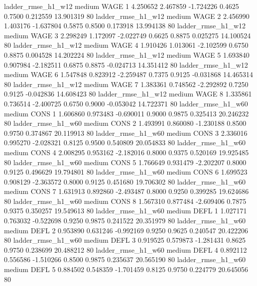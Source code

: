     ladder_rmse_h1_w12     medium     WAGE                 1  4.250652 2.467859 -1.724226 0.4625 0.7500  0.212559   13.901319 80
    ladder_rmse_h1_w12     medium     WAGE                 2  2.456990 1.403176 -1.637804 0.5875 0.8500  0.173918   13.994138 80
    ladder_rmse_h1_w12     medium     WAGE                 3  2.298249 1.172097 -2.022749 0.6625 0.8875  0.025275   14.100524 80
    ladder_rmse_h1_w12     medium     WAGE                 4  1.910426 1.013061 -2.102599 0.6750 0.8875  0.004528   14.202224 80
    ladder_rmse_h1_w12     medium     WAGE                 5  1.693840 0.907984 -2.182511 0.6875 0.8875 -0.024713   14.351412 80
    ladder_rmse_h1_w12     medium     WAGE                 6  1.547848 0.823912 -2.259487 0.7375 0.9125 -0.031868   14.465314 80
    ladder_rmse_h1_w12     medium     WAGE                 7  1.383361 0.748562 -2.292892 0.7250 0.9125 -0.042836   14.608423 80
    ladder_rmse_h1_w12     medium     WAGE                 8  1.335861 0.736514 -2.400725 0.6750 0.9000 -0.053042   14.722371 80
    ladder_rmse_h1_w60     medium     CONS                 1  1.606860 0.973483 -0.690011 0.9000 0.9875  0.325413   20.246232 80
    ladder_rmse_h1_w60     medium     CONS                 2  1.493991 0.860080 -1.230188 0.8500 0.9750  0.374867   20.119913 80
    ladder_rmse_h1_w60     medium     CONS                 3  2.336016 0.995270 -2.028321 0.8125 0.9500  0.540809   20.054833 80
    ladder_rmse_h1_w60     medium     CONS                 4  2.008295 0.953162 -2.182016 0.8000 0.9375  0.520169   19.925485 80
    ladder_rmse_h1_w60     medium     CONS                 5  1.766649 0.931479 -2.202207 0.8000 0.9125  0.496629   19.794801 80
    ladder_rmse_h1_w60     medium     CONS                 6  1.699523 0.908129 -2.363572 0.8000 0.9125  0.451680   19.706302 80
    ladder_rmse_h1_w60     medium     CONS                 7  1.631913 0.892860 -2.493487 0.8000 0.9250  0.399285   19.624686 80
    ladder_rmse_h1_w60     medium     CONS                 8  1.567310 0.877484 -2.609406 0.7875 0.9375  0.350257   19.549613 80
    ladder_rmse_h1_w60     medium     DEFL                 1  1.027171 0.763032 -0.522698 0.9250 0.9875  0.241522   20.351979 80
    ladder_rmse_h1_w60     medium     DEFL                 2  0.953890 0.631246 -0.992169 0.9250 0.9625  0.240547   20.422206 80
    ladder_rmse_h1_w60     medium     DEFL                 3  0.919525 0.579873 -1.281431 0.8625 0.9750  0.238699   20.488212 80
    ladder_rmse_h1_w60     medium     DEFL                 4  0.892112 0.556586 -1.510266 0.8500 0.9875  0.235637   20.565190 80
    ladder_rmse_h1_w60     medium     DEFL                 5  0.884502 0.548359 -1.701459 0.8125 0.9750  0.224779   20.645056 80
